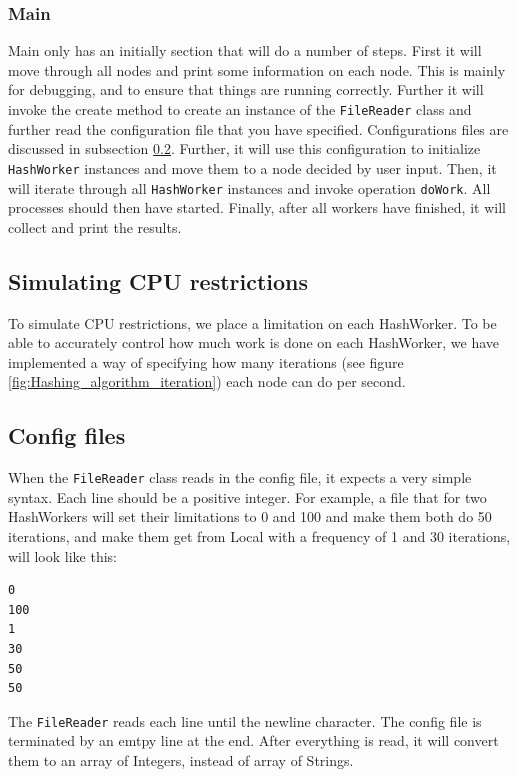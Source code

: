 \subsubsection{Main}
Main only has an initially section that will do a number of steps. First it will move through all nodes and print some information on each node. This is mainly for debugging, and to ensure that things are running correctly. Further it will invoke the create method to create an instance of the \verb|FileReader| class and further read the configuration file that you have specified. Configurations files are discussed in subsection \ref{subsection:configfiles}. Further, it will use this configuration to initialize \verb|HashWorker| instances and move them to a node decided by user input. Then, it will iterate through all \verb|HashWorker| instances and invoke operation \verb|doWork|. All processes should then have started. Finally, after all workers have finished, it will collect and print the results.



\subsection{Simulating CPU restrictions}
To simulate CPU restrictions, we place a limitation on each HashWorker. To be able to accurately control how much work is done on each HashWorker, we have implemented a way of specifying how many iterations (see figure \ref{fig:Hashing_algorithm_iteration}) each node can do per second.



\subsection{Config files}\label{subsection:configfiles}
When the \verb|FileReader| class reads in the config file, it expects a very simple syntax. Each line should be a positive integer. For example, a file that for two HashWorkers will set their limitations to 0 and 100 and make them both do 50 iterations, and make them get from Local with a frequency of 1 and 30 iterations, will look like this:
\begin{lstlisting}
0
100
1
30
50
50

\end{lstlisting}
The \verb|FileReader| reads each line until the newline character. The config file is terminated by an emtpy line at the end. After everything is read, it will convert them to an array of Integers, instead of array of Strings.

